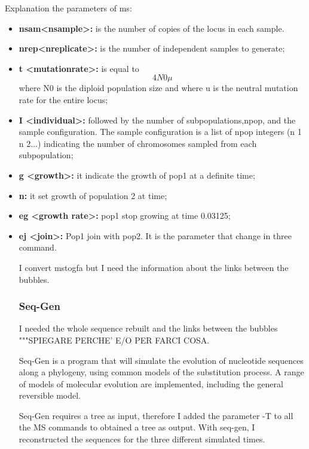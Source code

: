 Explanation the parameters of ms:

\begin{itemize}
\item\textbf{nsam<nsample>:}
is the number of copies of the locus in each sample.

\item\textbf{nrep<nreplicate>:}
is the number of independent samples to generate;


\item\textbf{t <mutationrate>:}
is equal to $$4N0\mu$$ where N0 is the diploid population size and where u is the neutral mutation rate for the entire locus;

\item\textbf{I <individual>:}
followed by the number of subpopulations,npop, and the sample configuration. The sample configuration is a list of npop integers (n 1 n 2...) indicating the number of chromosomes sampled from each subpopulation;

\item\textbf{g <growth>:}
 it indicate the growth of pop1 at a definite time;

\item\textbf{n:}
it set growth of population 2 at time; 

\item\textbf{eg <growth rate>:}
pop1 stop growing at time 0.03125;

\item\textbf{ej <join>:}
Pop1 join with pop2. It is the parameter that change in three command. 

I convert mstogfa but I need the information about the links between the bubbles.  

\subsubsection{Seq-Gen}
I needed the whole sequence rebuilt and the links between the bubbles """SPIEGARE PERCHE' E/O PER FARCI COSA.

Seq-Gen \cite{rambaut1997seq} is a program that will simulate the evolution of nucleotide sequences along a phylogeny, using common models of the substitution process. A range of models of molecular evolution are implemented, including the general reversible model. 

Seq-Gen requires a tree as input, therefore I added the parameter -T to all the MS commands to obtained a tree as output. With seq-gen, I reconstructed the sequences for the three different simulated times.


\end{itemize}
